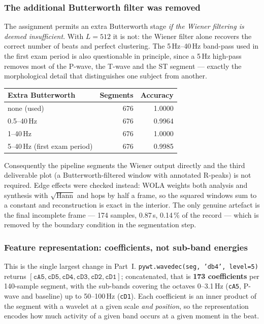\documentclass[11pt,a4paper]{article}
\newcommand{\hertz}{Hz}
\newcommand{\second}{s}
\newcommand{\percent}{\%}
\newcommand{\num}[1]{#1}
\newcommand{\SI}[2]{#1\,#2}
\newcommand{\SIrange}[3]{#1--#2\,#3}
\begin{document}
\subsubsection{The additional Butterworth filter was removed}
\label{sec:p1butter}

The assignment permits an extra Butterworth stage \emph{if the Wiener filtering is deemed
insufficient}. With $L=512$ it is not: the Wiener filter alone recovers the correct number of
beats and perfect clustering. The \SI{5}{\hertz}--\SI{40}{\hertz} band-pass used in the first
exam period is also questionable in principle, since a \SI{5}{\hertz} high-pass removes most
of the P-wave, the T-wave and the ST segment --- exactly the morphological detail that
distinguishes one subject from another.

\begin{center}\small
\begin{tabular}{lrr}
\toprule
Extra Butterworth & Segments & Accuracy \\
\midrule
none (used) & 676 & 1.0000 \\
\SIrange{0.5}{40}{\hertz} & 676 & 0.9964 \\
\SIrange{1}{40}{\hertz} & 676 & 1.0000 \\
\SIrange{5}{40}{\hertz} (first exam period) & 676 & 0.9985 \\
\bottomrule
\end{tabular}
\end{center}

Consequently the pipeline segments the Wiener output directly and the third deliverable plot
(a Butterworth-filtered window with annotated R-peaks) is not required. Edge effects were
checked instead: WOLA weights both analysis and synthesis with $\sqrt{\text{Hann}}$ and hops
by half a frame, so the squared windows sum to a constant and reconstruction is exact in the
interior. The only genuine artefact is the final incomplete frame --- \num{174} samples,
\SI{0.87}{\second}, \SI{0.14}{\percent} of the record --- which is removed by the boundary
condition in the segmentation step.

\subsubsection{Feature representation: coefficients, not sub-band energies}
\label{sec:p1feat}

This is the single largest change in Part~I. \texttt{pywt.wavedec(seg, 'db4', level=5)}
returns $[\texttt{cA5},\texttt{cD5},\texttt{cD4},\texttt{cD3},\texttt{cD2},\texttt{cD1}]$;
concatenated, that is \textbf{\num{173} coefficients} per \num{140}-sample segment, with the
sub-bands covering the octaves \SIrange{0}{3.1}{\hertz} (\texttt{cA5}, P-wave and baseline)
up to \SIrange{50}{100}{\hertz} (\texttt{cD1}). Each coefficient is an inner product of the
segment with a wavelet at a given scale \emph{and position}, so the representation encodes
how much activity of a given band occurs at a given moment in the beat.
\end{document}
